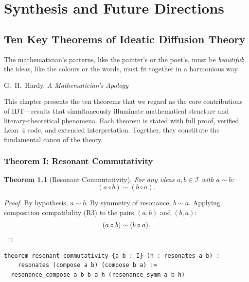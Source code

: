 \documentclass[11pt,openany]{book}
\theoremstyle{definition}
\theoremstyle{plain}
\newtheorem{theorem}[axiom]{Theorem}
\theoremstyle{remark}
\newcommand{\IS}{\mathcal{I}}               %
\newcommand{\compose}{\circ}                 %
\newcommand{\res}{\sim}                      %
\begin{document}
\part{Synthesis and Future Directions}

\chapter{Ten Key Theorems of Ideatic Diffusion Theory}
\label{ch:key-theorems}

\epigraph{The mathematician's patterns, like the painter's or the poet's, must be \emph{beautiful}; the ideas, like the colours or the words, must fit together in a harmonious way.}{G.\ H.\ Hardy, \textit{A Mathematician's Apology}}

This chapter presents the ten theorems that we regard as the core contributions of IDT---results that simultaneously illuminate mathematical structure and literary-theoretical phenomena. Each theorem is stated with full proof, verified Lean~4 code, and extended interpretation. Together, they constitute the fundamental canon of the theory.

\section{Theorem I: Resonant Commutativity}

\begin{theorem}[Resonant Commutativity]
\label{thm:key-resonant-comm}
For any ideas $a, b \in \IS$ with $a \res b$:
\[
(a \compose b) \res (b \compose a).
\]
\end{theorem}

\begin{proof}
By hypothesis, $a \res b$. By symmetry of resonance, $b \res a$. Applying composition compatibility (R3) to the pairs $(a, b)$ and $(b, a)$:
\[
(a \compose b) \res (b \compose a). \qedhere
\]
\end{proof}

\begin{lstlisting}
theorem resonant_commutativity {a b : I} (h : resonates a b) :
    resonates (compose a b) (compose b a) :=
  resonance_compose a b b a h (resonance_symm a b h)
\end{lstlisting}
\end{document}
